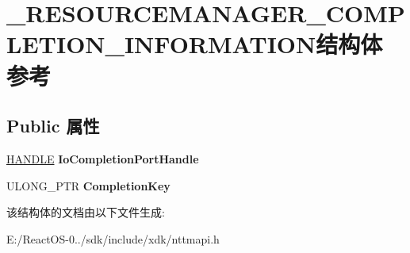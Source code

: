 \hypertarget{struct___r_e_s_o_u_r_c_e_m_a_n_a_g_e_r___c_o_m_p_l_e_t_i_o_n___i_n_f_o_r_m_a_t_i_o_n}{}\section{\+\_\+\+R\+E\+S\+O\+U\+R\+C\+E\+M\+A\+N\+A\+G\+E\+R\+\_\+\+C\+O\+M\+P\+L\+E\+T\+I\+O\+N\+\_\+\+I\+N\+F\+O\+R\+M\+A\+T\+I\+O\+N结构体 参考}
\label{struct___r_e_s_o_u_r_c_e_m_a_n_a_g_e_r___c_o_m_p_l_e_t_i_o_n___i_n_f_o_r_m_a_t_i_o_n}
\subsection*{Public 属性}
\begin{DoxyCompactItemize}
\item 
\mbox{\label{struct___r_e_s_o_u_r_c_e_m_a_n_a_g_e_r___c_o_m_p_l_e_t_i_o_n___i_n_f_o_r_m_a_t_i_o_n_a2af9c3ff6496b2d34d0dd29c66265b4f}} 
\hyperlink{interfacevoid}{H\+A\+N\+D\+LE} {\bfseries Io\+Completion\+Port\+Handle}
\item 
\mbox{\label{struct___r_e_s_o_u_r_c_e_m_a_n_a_g_e_r___c_o_m_p_l_e_t_i_o_n___i_n_f_o_r_m_a_t_i_o_n_a8aa5d183d858243815a39538772bd370}} 
U\+L\+O\+N\+G\+\_\+\+P\+TR {\bfseries Completion\+Key}
\end{DoxyCompactItemize}


该结构体的文档由以下文件生成\+:\begin{DoxyCompactItemize}
\item 
E\+:/\+React\+O\+S-\/0../sdk/include/xdk/nttmapi.\+h\end{DoxyCompactItemize}
